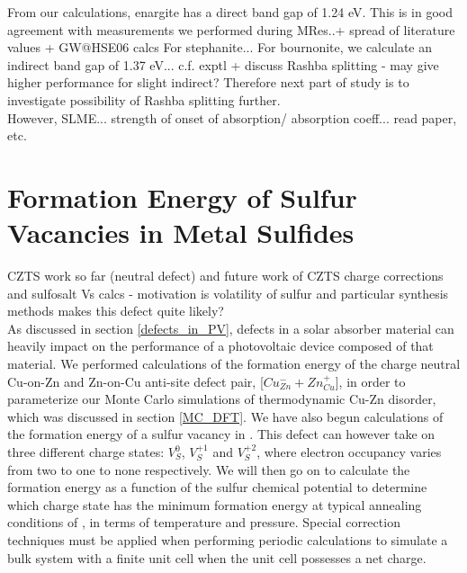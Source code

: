 From our calculations, enargite has a direct band gap of 1.24 eV. This is in good agreement with measurements we performed during MRes..+ spread of literature values + GW@HSE06 calcs
For stephanite...
For bournonite, we calculate an indirect band gap of 1.37 eV... c.f. exptl + discuss Rashba splitting - may give higher performance for slight indirect?
Therefore next part of study is to investigate possibility of Rashba splitting further.\\

However, SLME... strength of onset of absorption/ absorption coeff... read paper, etc.



\section{Formation Energy of Sulfur Vacancies in Metal Sulfides}\label{Vs_proj}
CZTS work so far (neutral defect) and future work of CZTS charge corrections and sulfosalt Vs calcs - motivation is volatility of sulfur and particular synthesis methods makes this defect quite likely?\\

As discussed in section \ref{defects_in_PV}, defects in a solar absorber material can heavily impact on the performance of a photovoltaic device composed of that material. We performed calculations of the formation energy of the charge neutral Cu-on-Zn and Zn-on-Cu anti-site defect pair, [$Cu_{Zn}^- + Zn_{Cu}^+$], in order to parameterize our Monte Carlo simulations of thermodynamic Cu-Zn disorder, which was discussed in section \ref{MC_DFT}. We have also begun calculations of the formation energy of a sulfur vacancy in { \CZTS }. This defect can however take on three different charge states: $V_{S}^{0}$, $V_{S}^{+1}$ and $V_{S}^{+2}$, where electron occupancy varies from two to one to none respectively. We will then go on to calculate the formation energy as a function of the sulfur chemical potential to determine which charge state has the minimum formation energy at typical annealing conditions of { \CZTS }, in terms of temperature and pressure. Special correction techniques must be applied when performing periodic calculations to simulate a bulk system with a finite unit cell when the unit cell possesses a net charge. \\

